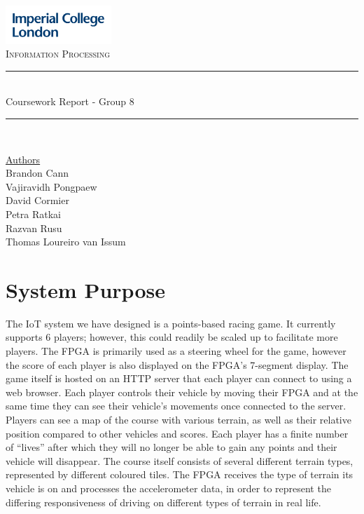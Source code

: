 \documentclass[12pt,a4paper]{article}
\begin{document}
\begin{titlepage}
	\newcommand{\HRule}{\rule{\linewidth}{0.5mm}}
    \includegraphics[width = 4cm]{./Images/Logo.jpg}\\[0.5cm] 
    
    \center 
	\textsc{\large Information Processing }\\[0.3cm] 
    
	\HRule \\[0.3cm]
	Coursework Report - Group 8
    \HRule \\[0.7cm]
     
    \begin{center}
		\underline{Authors}\\[0.1cm] Brandon Cann\\[0.1cm]
        Vajiravidh Pongpaew\\[0.1cm]
        David Cormier\\[0.1cm]
        Petra Ratkai\\[0.1cm]
		Razvan Rusu\\[0.1cm]
		Thomas Loureiro van Issum \\[0.7cm]
	\end{center} \large

    \tableofcontents

    \vfill %
\end{titlepage}

\section{\small System Purpose}

{\scriptsize The IoT system we have designed is a points-based racing game. 
It currently supports 6 players; however, this could readily be 
scaled up to facilitate more players. The FPGA is primarily used 
as a steering wheel for the game, however the score of each player 
is also displayed on the FPGA’s 7-segment display. The game itself 
is hosted on an HTTP server that each player can connect to using a 
web browser. Each player controls their vehicle by moving their FPGA 
and at the same time they can see their vehicle’s movements once 
connected to the server. Players can see a map of the course with 
various terrain, as well as their relative position compared to 
other vehicles and scores. Each player has a finite number of “lives” 
after which they will no longer be able to gain any points and their 
vehicle will disappear. The course itself consists of several different 
terrain types, represented by different coloured tiles. The FPGA 
receives the type of terrain its vehicle is on and processes the 
accelerometer data, in order to represent the differing responsiveness 
of driving on different types of terrain in real life. }
\end{document}
